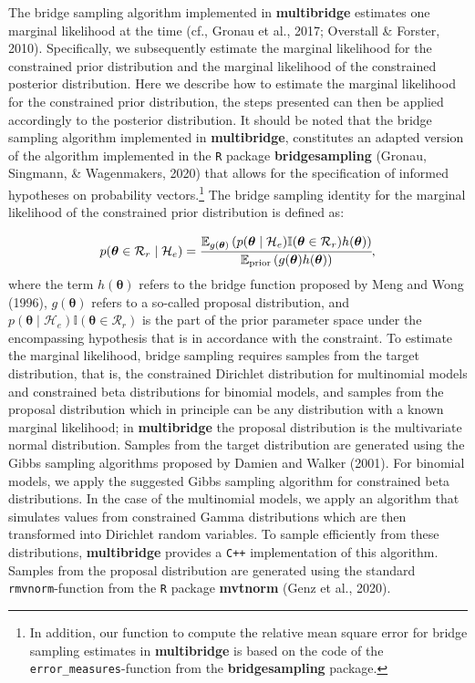 \documentclass[
  english,
  man,floatsintext]{apa6}
\begin{document}
The bridge sampling algorithm implemented in \textbf{multibridge} estimates one marginal likelihood at the time (cf., Gronau et al., 2017; Overstall \& Forster, 2010). Specifically, we subsequently estimate the marginal likelihood for the constrained prior distribution and the marginal likelihood of the constrained posterior distribution. Here we describe how to estimate the marginal likelihood for the constrained prior distribution, the steps presented can then be applied accordingly to the posterior distribution. It should be noted that the bridge sampling algorithm implemented in \textbf{multibridge}, constitutes an adapted version of the algorithm implemented in the \texttt{R} package \textbf{bridgesampling} (Gronau, Singmann, \& Wagenmakers, 2020) that allows for the specification of informed hypotheses on probability vectors.\footnote{In addition, our function to compute the relative mean square error for bridge sampling estimates in \textbf{multibridge} is based on the code of the \texttt{error\_measures}-function from the \textbf{bridgesampling} package.} The bridge sampling identity for the marginal likelihood of the constrained prior distribution is defined as:

\begin{align}
    p(\boldsymbol{\theta} \in \mathcal{R}_r \mid \mathcal{H}_e) = \cfrac{\mathbb{E}_{g(\boldsymbol{\theta})}\left(p(\boldsymbol{\theta}\mid \mathcal{H}_e) \mathbb{I}(\boldsymbol{\theta}\in\mathcal{R}_r)h(\boldsymbol{\theta})\right)}{\mathbb{E}_{\text{prior}} \left(g(\boldsymbol{\theta})h(\boldsymbol{\theta})\right)},
    \label{Eq:bridgeidentity}
\end{align}
where the term \(h(\boldsymbol{\theta})\) refers to the bridge function proposed by Meng and Wong (1996), \(g(\boldsymbol{\theta})\) refers to a so-called proposal distribution, and \(p(\boldsymbol{\theta}\mid \mathcal{H}_e) \mathbb{I}(\boldsymbol{\theta}\in\mathcal{R}_r)\) is the part of the prior parameter space under the encompassing hypothesis that is in accordance with the constraint. To estimate the marginal likelihood, bridge sampling requires samples from the target distribution, that is, the constrained Dirichlet distribution for multinomial models and constrained beta distributions for binomial models, and samples from the proposal distribution which in principle can be any distribution with a known marginal likelihood; in \textbf{multibridge} the proposal distribution is the multivariate normal distribution. Samples from the target distribution are generated using the Gibbs sampling algorithms proposed by Damien and Walker (2001). For binomial models, we apply the suggested Gibbs sampling algorithm for constrained beta distributions. In the case of the multinomial models, we apply an algorithm that simulates values from constrained Gamma distributions which are then transformed into Dirichlet random variables. To sample efficiently from these distributions, \textbf{multibridge} provides a \texttt{C++} implementation of this algorithm. Samples from the proposal distribution are generated using the standard \texttt{rmvnorm}-function from the \texttt{R} package \textbf{mvtnorm} (Genz et al., 2020).
\end{document}
